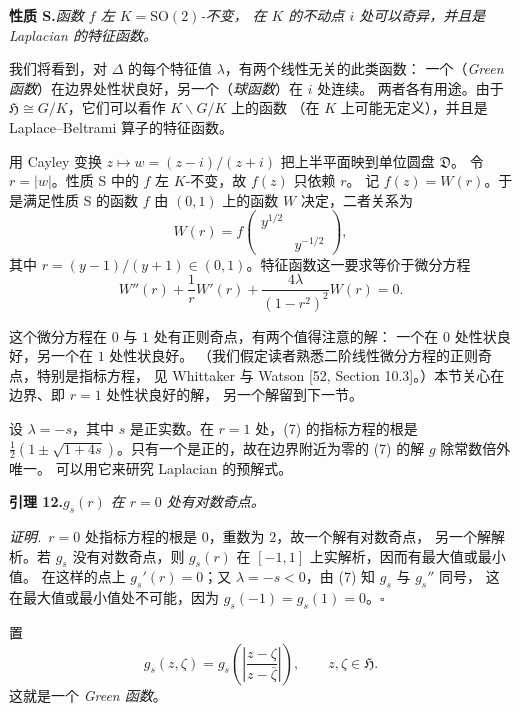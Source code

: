 \par\medskip\noindent\textbf{性质 S.}\quad\emph{函数 $f$ 左 $K=\mathrm{SO}(2)$-不变，
在 $K$ 的不动点 $i$ 处可以奇异，并且是 Laplacian 的特征函数。}

我们将看到，对 $\Delta$ 的每个特征值 $\lambda$，有两个线性无关的此类函数：
一个（\emph{Green 函数}）在边界处性状良好，另一个（\emph{球函数}）在 $i$ 处连续。
两者各有用途。由于 $\mathfrak{H}\cong G/K$，它们可以看作 $K\backslash G/K$ 上的函数
（在 $K$ 上可能无定义），并且是 Laplace--Beltrami 算子的特征函数。

用 Cayley 变换 $z\mapsto w=(z-i)/(z+i)$ 把上半平面映到单位圆盘 $\mathfrak{D}$。
令 $r=|w|$。性质 S 中的 $f$ 左 $K$-不变，故 $f(z)$ 只依赖 $r$。
记 $f(z)=W(r)$。于是满足性质 S 的函数 $f$ 由 $(0,1)$ 上的函数 $W$ 决定，二者关系为
\[
W(r)=f\begin{pmatrix}y^{1/2}&\\&y^{-1/2}\end{pmatrix},
\]
其中 $r=(y-1)/(y+1)\in(0,1)$。特征函数这一要求等价于微分方程
\begin{equation}\tag{7}
W''(r)+\frac{1}{r}W'(r)+\frac{4\lambda}{(1-r^{2})^{2}}W(r)=0 .
\end{equation}

这个微分方程在 $0$ 与 $1$ 处有正则奇点，有两个值得注意的解：
一个在 $0$ 处性状良好，另一个在 $1$ 处性状良好。
（我们假定读者熟悉二阶线性微分方程的正则奇点，特别是指标方程，
见 Whittaker 与 Watson [52, Section 10.3]。）本节关心在边界、即 $r=1$ 处性状良好的解，
另一个解留到下一节。

设 $\lambda=-s$，其中 $s$ 是正实数。在 $r=1$ 处，(7) 的指标方程的根是
$\tfrac12(1\pm\sqrt{1+4s})$。只有一个是正的，故在边界附近为零的 (7) 的解 $g$ 除常数倍外唯一。
可以用它来研究 Laplacian 的预解式。

\par\medskip\noindent\textbf{引理 12.}\quad\emph{$g_{s}(r)$ 在 $r=0$ 处有对数奇点。}

\smallskip
\noindent\emph{证明.}\ $r=0$ 处指标方程的根是 $0$，重数为 $2$，故一个解有对数奇点，
另一个解解析。若 $g_{s}$ 没有对数奇点，则 $g_{s}(r)$ 在 $[-1,1]$ 上实解析，因而有最大值或最小值。
在这样的点上 $g_{s}'(r)=0$；又 $\lambda=-s<0$，由 (7) 知 $g_{s}$ 与 $g_{s}''$ 同号，
这在最大值或最小值处不可能，因为 $g_{s}(-1)=g_{s}(1)=0$。\hfill$\square$

置
\[
g_{s}(z,\zeta)=g_{s}\!\left(\left|\frac{z-\zeta}{z-\bar\zeta}\right|\right),
\qquad z,\zeta\in\mathfrak{H}.
\]
这就是一个 \emph{Green 函数}。

